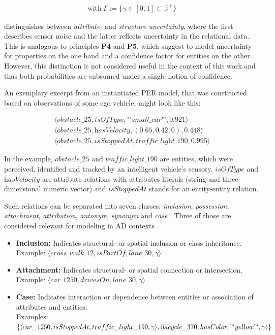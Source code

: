 \vspace{-12ex}

\begin{gather*}
	\text{with} \  \Gamma := \{ \gamma \in [0, 1] \subset \mathbb{R}^+ \}
\end{gather*}

\cite{Petrich2018} distinguishes between \textit{attribute-} and \textit{structure uncertainty}, where the first describes sensor noise and the latter reflects uncertainty in the relational data. This is analogous to principles \textbf{P4} and \textbf{P5}, which suggest to model uncertainty for properties on the one hand and a confidence factor for entities on the other. However, this distinction is not considered useful in the context of this work and thus both probabilities are subsumed under a single notion of confidence.

An exemplary excerpt from an instantiated PER model, that was constructed based on observations of some ego vehicle, might look like this:

\begin{gather*}
	\langle \textit{obstacle\_25}, \textit{isOfType}, \textit{"'small\_car"'}, 0.921 \rangle \\
	\langle \textit{obstacle\_25}, \textit{hasVelocity}, (0.65, 0.42, 0), 0.448 \rangle \\
	\langle \textit{obstacle\_25}, \textit{isStoppedAt}, \textit{traffic\_light\_190}, 0.995 \rangle
\end{gather*}

In the example, $\textit{obstacle\_25}$ and $\textit{traffic\_light\_190}$ are entities, which were perceived, identified and tracked by an intelligent vehicle's sensory. $\textit{isOfType}$ and $\textit{hasVelocity}$ are attribute relations with attributes literals (string and three-dimensional numeric vector) and $\textit{isStoppedAt}$ stands for an entity-entity relation.

Such relations can be separated into seven classes: \textit{inclusion}, \textit{possession}, \textit{attachment}, \textit{attribution}, \textit{antonym}, \textit{synonym} and \textit{case} \cite{Storey1993}. Three of those are considered relevant for modeling in AD contexts \cite{Petrich2018}.

\begin{itemize}
	\item \textbf{Inclusion:} Indicates structural- or spatial inclusion or class inheritance. \\ Example: $\langle  cross\_walk\_12, isPartOf, lane\_30, \gamma \rangle$
	\item \textbf{Attachment:} Indicates structural- or spatial connection or intersection. \\ Example: $\langle car\_1250, drivesOn, lane\_30, \gamma \rangle$
	\item \textbf{Case:} Indicates interaction or dependence between entities or association of attributes and entities. \\ Examples: $\{ \langle car\_1250, isStoppedAt, traffic\_light\_190, \gamma \rangle, \langle bicycle\_370, hasColor, \\ "'yellow"', \gamma \rangle \}$
\end{itemize}

